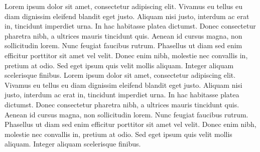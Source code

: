 \documentclass{article}
\begin{document}
\begin{pages}
\begin{Leftside}
\pend
\pstart
Lorem ipsum dolor sit amet, consectetur adipiscing elit. Vivamus eu tellus eu diam dignissim eleifend blandit eget justo. Aliquam nisi justo, interdum ac erat in, tincidunt imperdiet urna. In hac habitasse platea dictumst. Donec consectetur pharetra nibh, a ultrices mauris tincidunt quis. Aenean id cursus magna, non sollicitudin lorem. Nunc feugiat faucibus rutrum. Phasellus ut diam sed enim efficitur porttitor sit amet vel velit. Donec enim nibh, molestie nec convallis in, pretium at odio. Sed eget ipsum quis velit mollis aliquam. Integer aliquam scelerisque finibus.
\pend
\pstart
Lorem ipsum dolor sit amet, consectetur adipiscing elit. Vivamus eu tellus eu diam dignissim eleifend blandit eget justo. Aliquam nisi justo, interdum ac erat in, tincidunt imperdiet urna. In hac habitasse platea dictumst. Donec consectetur pharetra nibh, a ultrices mauris tincidunt quis. Aenean id cursus magna, non sollicitudin lorem. Nunc feugiat faucibus rutrum. Phasellus ut diam sed enim efficitur porttitor sit amet vel velit. Donec enim nibh, molestie nec convallis in, pretium at odio. Sed eget ipsum quis velit mollis aliquam. Integer aliquam scelerisque finibus.
\pend[\relax]
\endnumbering
\end{Leftside}

\end{pages}
\Pages
\end{document}
